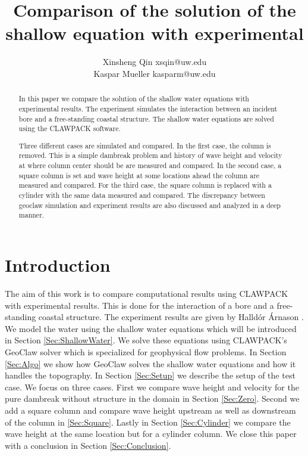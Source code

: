 \documentclass[11pt]{article}
\title{Comparison of the solution of the shallow equation with experimental}
\author{Xinsheng Qin xsqin@uw.edu\\
        Kaspar Mueller kasparm@uw.edu}
\begin{document}
\maketitle

\begin{abstract}
In this paper we compare the solution of the shallow water equations with experimental results. The experiment simulates the interaction between an incident bore and a free-standing coastal structure. The shallow water equations are solved using the CLAWPACK software.
\par
Three different cases are simulated and compared. In the first case, the column is removed. 
This is a simple dambreak problem and history of wave height and velocity at where column center should be are measured and compared. 
In the second case, a square column is set and wave height at some locations ahead the column are measured and compared. 
For the third case, the square column is replaced with a cylinder with the same data measured and compared. 
The discrepancy between geoclaw simulation and experiment results are also discussed and analyzed in a deep manner.
\end{abstract}

\section{Introduction}\label{Sec:intro}
The aim of this work is to compare computational results using CLAWPACK with experimental results. This is done for the interaction of a bore and a free-standing coastal structure. The experiment results are given by Halld\'or \'Arnason \cite{HA}. We model the water using the shallow water equations which will be introduced in Section \ref{Sec:ShallowWater}. We solve these equations using CLAWPACK's GeoClaw solver which is specialized for geophysical flow problems. In Section \ref{Sec:Algo} we show how GeoClaw solves the shallow water equations and how it handles the topography. In Section \ref{Sec:Setup} we describe the setup of the test case. We focus on three cases. First we compare wave height and velocity for the pure dambreak without structure in the domain in Section \ref{Sec:Zero}. Second we add a square column and compare wave height upstream as well as downstream of the column in \ref{Sec:Square}. Lastly in Section \ref{Sec:Cylinder} we compare the wave height at the same location but for a cylinder column. We close this paper with a conclusion in Section \ref{Sec:Conclusion}.
\end{document}
